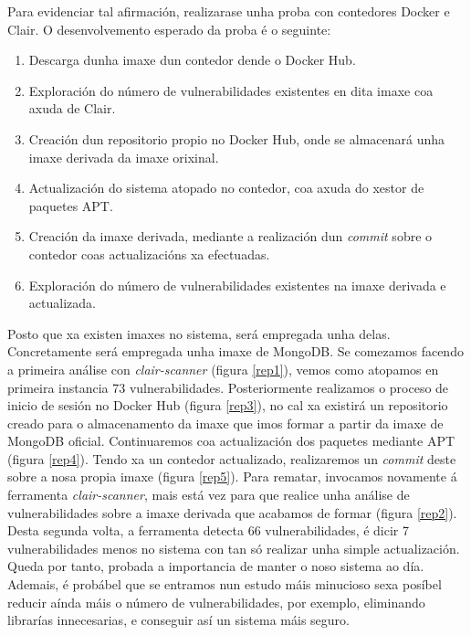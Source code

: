 Para evidenciar tal afirmación, realizarase unha proba con contedores Docker e Clair. O desenvolvemento esperado da proba é o seguinte:

\begin{enumerate}
    \item Descarga dunha imaxe dun contedor dende o Docker Hub.
    \item Exploración do número de vulnerabilidades existentes en dita imaxe coa axuda de Clair.
    \item Creación dun repositorio propio no Docker Hub, onde se almacenará unha imaxe derivada da imaxe orixinal.
    \item Actualización do sistema atopado no contedor, coa axuda do xestor de paquetes \gls{APT}.
    \item Creación da imaxe derivada, mediante a realización dun \textit{commit} sobre o contedor coas actualizacións xa efectuadas.
    \item Exploración do número de vulnerabilidades existentes na imaxe derivada e actualizada.
\end{enumerate}

Posto que xa existen imaxes no sistema, será empregada unha delas. Concretamente será empregada unha imaxe de MongoDB. Se comezamos facendo a primeira análise con \textit{clair-scanner} (figura \ref{rep1}), vemos como atopamos en primeira instancia 73 vulnerabilidades. Posteriormente realizamos o proceso de inicio de sesión no Docker Hub (figura \ref{rep3}), no cal xa existirá un repositorio creado para o almacenamento da imaxe que imos formar a partir da imaxe de MongoDB oficial. Continuaremos coa actualización dos paquetes mediante \gls{APT} (figura \ref{rep4}). Tendo xa un contedor actualizado, realizaremos un \textit{commit} deste sobre a nosa propia imaxe (figura \ref{rep5}). Para rematar, invocamos novamente á ferramenta \textit{clair-scanner}, mais está vez para que realice unha análise de vulnerabilidades sobre a imaxe derivada que acabamos de formar (figura \ref{rep2}). Desta segunda volta, a ferramenta detecta 66 vulnerabilidades, é dicir 7 vulnerabilidades menos no sistema con tan só realizar unha simple actualización. Queda por tanto, probada a importancia de manter o noso sistema ao día. Ademais, é probábel que se entramos nun estudo máis minucioso sexa posíbel reducir aínda máis o número de vulnerabilidades, por exemplo, eliminando librarías innecesarias, e conseguir así un sistema máis seguro.

